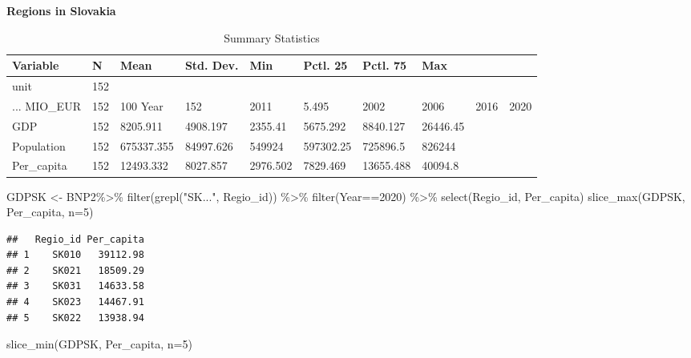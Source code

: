 \documentclass[
]{article}
\newenvironment{Shaded}{\begin{snugshade}}{\end{snugshade}}
\newcommand{\AttributeTok}[1]{\textcolor[rgb]{0.77,0.63,0.00}{#1}}
\newcommand{\DecValTok}[1]{\textcolor[rgb]{0.00,0.00,0.81}{#1}}
\newcommand{\FunctionTok}[1]{\textcolor[rgb]{0.00,0.00,0.00}{#1}}
\newcommand{\NormalTok}[1]{#1}
\newcommand{\OtherTok}[1]{\textcolor[rgb]{0.56,0.35,0.01}{#1}}
\newcommand{\SpecialCharTok}[1]{\textcolor[rgb]{0.00,0.00,0.00}{#1}}
\newcommand{\StringTok}[1]{\textcolor[rgb]{0.31,0.60,0.02}{#1}}
\begin{document}
\textbf{Regions in Slovakia}

\begin{table}

\caption{\label{tab:unnamed-chunk-12}Summary Statistics}
\centering
\begin{tabular}[t]{llllllll}
\toprule
Variable & N & Mean & Std. Dev. & Min & Pctl. 25 & Pctl. 75 & Max\\
\midrule
unit & 152 &  &  &  &  &  & \\
... MIO_EUR & 152 & 100%
Year & 152 & 2011 & 5.495 & 2002 & 2006 & 2016 & 2020\\
GDP & 152 & 8205.911 & 4908.197 & 2355.41 & 5675.292 & 8840.127 & 26446.45\\
Population & 152 & 675337.355 & 84997.626 & 549924 & 597302.25 & 725896.5 & 826244\\
\addlinespace
Per_capita & 152 & 12493.332 & 8027.857 & 2976.502 & 7829.469 & 13655.488 & 40094.8\\
\bottomrule
\end{tabular}
\end{table}

\begin{Shaded}
\begin{Highlighting}[]
\NormalTok{GDPSK }\OtherTok{\textless{}{-}}\NormalTok{ BNP2}\SpecialCharTok{\%\textgreater{}\%}
  \FunctionTok{filter}\NormalTok{(}\FunctionTok{grepl}\NormalTok{(}\StringTok{"SK..."}\NormalTok{, Regio\_id)) }\SpecialCharTok{\%\textgreater{}\%}
  \FunctionTok{filter}\NormalTok{(Year}\SpecialCharTok{==}\DecValTok{2020}\NormalTok{) }\SpecialCharTok{\%\textgreater{}\%}
  \FunctionTok{select}\NormalTok{(Regio\_id, Per\_capita)}
\FunctionTok{slice\_max}\NormalTok{(GDPSK, Per\_capita, }\AttributeTok{n=}\DecValTok{5}\NormalTok{)}
\end{Highlighting}
\end{Shaded}

\begin{verbatim}
##   Regio_id Per_capita
## 1    SK010   39112.98
## 2    SK021   18509.29
## 3    SK031   14633.58
## 4    SK023   14467.91
## 5    SK022   13938.94
\end{verbatim}

\begin{Shaded}
\begin{Highlighting}[]
\FunctionTok{slice\_min}\NormalTok{(GDPSK, Per\_capita, }\AttributeTok{n=}\DecValTok{5}\NormalTok{)}
\end{Highlighting}
\end{Shaded}
\end{document}
